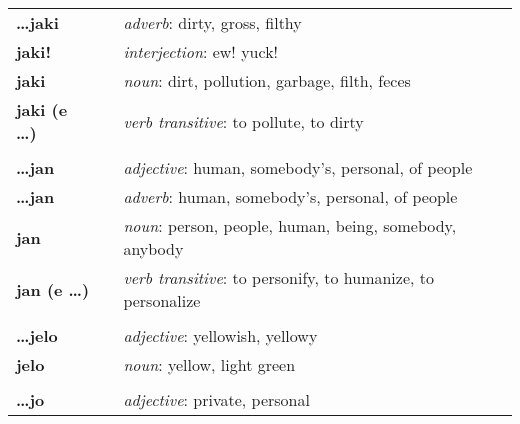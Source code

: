 \begin{supertabular}{p{2,5cm}|ll}
    \textbf{\dots jaki}          &  & \textit{adverb}: dirty, gross, filthy                                                                      \\
    \textbf{jaki!}               &  & \textit{interjection}: ew! yuck!                                                                           \\
    \textbf{jaki}                &  & \textit{noun}: dirt, pollution, garbage, filth, feces                                                      \\
    \textbf{jaki (e \dots)}      &  & \textit{verb transitive}: to pollute, to dirty                                                             \\
                                 &  &                                                                                                            \\ %
    \textbf{\dots jan}           &  & \textit{adjective}: human, somebody's, personal, of people                                                 \\
    \textbf{\dots jan}           &  & \textit{adverb}: human, somebody's, personal, of people                                                    \\
    \textbf{jan}                 &  & \textit{noun}: person, people, human, being, somebody, anybody                                             \\
    \textbf{jan (e \dots)}       &  & \textit{verb transitive}: to personify, to humanize, to personalize                                        \\
                                 &  &                                                                                                            \\ %
    \textbf{\dots jelo}          &  & \textit{adjective}: yellowish, yellowy                                                                     \\
    \textbf{jelo}                &  & \textit{noun}: yellow, light green                                                                         \\
                                 &  &                                                                                                            \\ %
    \textbf{\dots jo}            &  & \textit{adjective}: private, personal                                                                      \\

\end{supertabular}
